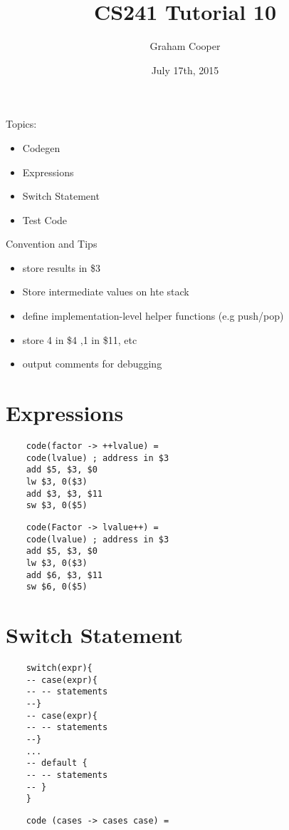 \documentclass[12pt]{article}
\title{\vspace{-15ex}CS241 Tutorial 10\vspace{-1ex}}
\date{July 17th, 2015}
\author{Graham Cooper}
\begin{document}
	\maketitle
	
	Topics:\\
	\begin{itemize}
		\item Codegen
		\item Expressions
		\item Switch Statement
		\item Test Code
	\end{itemize}
	
	Convention and Tips\\
	\begin{itemize}
		\item store results in \$3
		\item Store intermediate values on hte stack
		\item define implementation-level helper functions (e.g push/pop)
		\item store 4 in \$4 ,1 in \$11, etc
		\item output comments for debugging
	\end{itemize}
	
	\section*{Expressions}
	\begin{verbatim}
	code(factor -> ++lvalue) = 
	code(lvalue) ; address in $3
	add $5, $3, $0
	lw $3, 0($3)
	add $3, $3, $11
	sw $3, 0($5)
	\end{verbatim}
	
	\begin{verbatim}
	code(Factor -> lvalue++) =
	code(lvalue) ; address in $3
	add $5, $3, $0
	lw $3, 0($3)
	add $6, $3, $11
	sw $6, 0($5)
	\end{verbatim}
	
	\section*{Switch Statement}
	\begin{verbatim}
	switch(expr){
	-- case(expr){
	-- -- statements
	--}
	-- case(expr){
	-- -- statements
	--}
	...
	-- default {
	-- -- statements
	-- }
	}
	\end{verbatim}
	
	\begin{verbatim}
	code (cases -> cases case) = 
	
	\end{verbatim}
	
\end{document}
